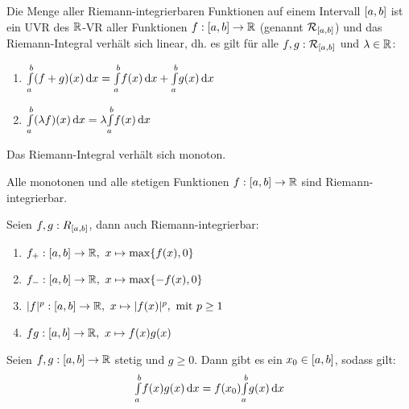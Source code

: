 \documentclass{cheat-sheet}
\begin{document}
\begin{satz}
  Die Menge aller Riemann-integrierbaren Funktionen auf einem Intervall $\left[ a, b \right]$ ist ein UVR des $\mathbb{R}$-VR aller Funktionen $f : \left[ a, b \right] \to \mathbb{R}$ (genannt $\mathcal{R}_{\left[ a, b \right]}$) und das Riemann-Integral verhält sich linear, dh. es gilt für alle $f, g : \mathcal{R}_{\left[ a, b \right]}$ und $\lambda \in \mathbb{R}$:

  \begin{enumerate}
    \item ${\textstyle \int\limits_{a}^{b}} (f + g)(x) \,\mathrm{d} x = {\textstyle \int\limits_{a}^{b}} f(x) \,\mathrm{d} x + {\textstyle \int\limits_{a}^{b}} g(x) \,\mathrm{d} x$
    \item ${\textstyle \int\limits_{a}^{b}} (\lambda f)(x) \,\mathrm{d} x = \lambda {\textstyle \int\limits_{a}^{b}} f(x) \,\mathrm{d} x$
  \end{enumerate}
\end{satz}

\begin{satz}
  Das Riemann-Integral verhält sich monoton.
\end{satz}


\begin{satz}
  Alle monotonen und alle stetigen Funktionen $f : \left[ a, b \right] \to \mathbb{R}$ sind Riemann-integrierbar.
\end{satz}

\begin{satz}
  Seien $f, g : R_{\left[ a, b \right]}$, dann auch Riemann-integrierbar:
  \begin{enumerate}
    \item $f_{+} : \left[ a, b \right] \to \mathbb{R},\ x \mapsto \max\{f(x), 0\}$
    \item $f_{-} : \left[ a, b \right] \to \mathbb{R},\ x \mapsto \max\{-f(x), 0\}$
    \item $\lvert f\rvert^{p} : \left[ a, b \right] \to \mathbb{R},\ x \mapsto \lvert f(x)\rvert^p, \text{ mit } p \ge 1$
    \item $fg : \left[ a, b \right] \to \mathbb{R},\ x \mapsto f(x)g(x)$
  \end{enumerate}
\end{satz}

\begin{satz}
  Seien $f, g : \left[ a, b \right] \to \mathbb{R}$ stetig und $g \ge 0$. Dann gibt es ein $x_0 \in \left[ a, b \right]$, sodass gilt:
  \[ {\textstyle \int\limits_{a}^{b}} f(x)g(x) \,\mathrm{d} x = f(x_0) {\textstyle \int\limits_{a}^{b}} g(x) \,\mathrm{d} x \]
\end{satz}
\end{document}
